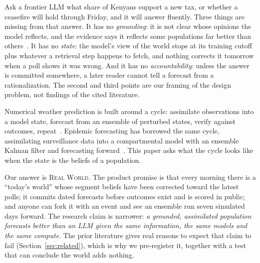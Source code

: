 \documentclass[11pt]{article}
\newcommand{\RW}{\textsc{Real World}}
\begin{document}
Ask a frontier LLM what share of Kenyans support a new tax, or whether a ceasefire will hold through Friday, and it will answer fluently. Three things are missing from that answer. It has no \emph{grounding}: it is not clear whose opinions the model reflects, and the evidence says it reflects some populations far better than others~\citep{santurkar2023whose,durmus2023global,tao2024cultural}. It has no \emph{state}: the model's view of the world stops at its training cutoff plus whatever a retrieval step happens to fetch, and nothing corrects it tomorrow when a poll shows it was wrong. And it has no \emph{accountability}: unless the answer is committed somewhere, a later reader cannot tell a forecast from a rationalization. The second and third points are our framing of the design problem, not findings of the cited literature.

Numerical weather prediction is built around a cycle: assimilate observations into a model state, forecast from an ensemble of perturbed states, verify against outcomes, repeat~\citep{bauer2015quiet,leutbecher2008ensemble}. Epidemic forecasting has borrowed the same cycle, assimilating surveillance data into a compartmental model with an ensemble Kalman filter and forecasting forward~\citep{shaman2012forecasting}. This paper asks what the cycle looks like when the state is the beliefs of a population.

Our answer is \RW{}. The product promise is that every morning there is a ``today's world'' whose segment beliefs have been corrected toward the latest polls; it commits dated forecasts before outcomes exist and is scored in public; and anyone can fork it with an event and see an ensemble run seven simulated days forward. The research claim is narrower: \emph{a grounded, assimilated population forecasts better than an LLM given the same information, the same models and the same compute}. The prior literature gives real reasons to expect that claim to fail (Section~\ref{sec:related}), which is why we pre-register it, together with a test that can conclude the world adds nothing.
\end{document}

